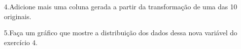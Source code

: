 \documentclass[]{article}
\newenvironment{Shaded}{\begin{snugshade}}{\end{snugshade}}
\newcommand{\KeywordTok}[1]{\textcolor[rgb]{0.13,0.29,0.53}{\textbf{#1}}}
\newcommand{\DecValTok}[1]{\textcolor[rgb]{0.00,0.00,0.81}{#1}}
\newcommand{\OperatorTok}[1]{\textcolor[rgb]{0.81,0.36,0.00}{\textbf{#1}}}
\newcommand{\NormalTok}[1]{#1}
\begin{document}
4.Adicione mais uma coluna gerada a partir da transformação de uma das
10 originais.

\begin{Shaded}
\end{Shaded}

5.Faça um gráfico que mostre a distribuição dos dados dessa nova
variável do exercício 4.
\end{document}
